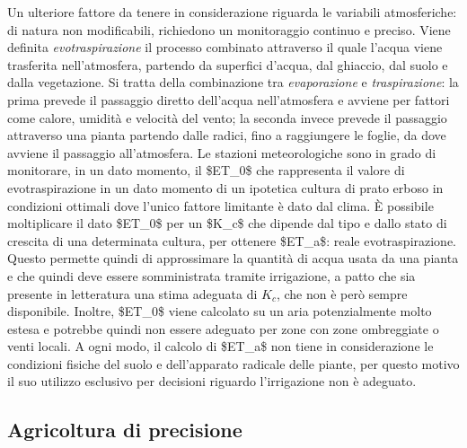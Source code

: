 \documentclass[12pt,a4paper,openright,twoside]{book}
\begin{document}
Un ulteriore fattore da tenere in considerazione riguarda le variabili atmosferiche: di natura non modificabili, richiedono un monitoraggio continuo e preciso. Viene definita \textit{evotraspirazione} il processo combinato attraverso il quale l'acqua viene trasferita nell'atmosfera, partendo da superfici d'acqua, dal ghiaccio, dal suolo e dalla vegetazione\cite{Kirkham2014}. Si tratta della combinazione tra \textit{evaporazione} e \textit{traspirazione}: la prima prevede il passaggio diretto dell'acqua nell'atmosfera e avviene per fattori come calore, umidità e velocità del vento; la seconda invece prevede il passaggio attraverso una pianta partendo dalle radici, fino a raggiungere le foglie, da dove avviene il passaggio all'atmosfera.
Le stazioni meteorologiche\cite{Allen1998CropE} sono in grado di monitorare, in un dato momento, il \ac{$ET_0$} che rappresenta il valore di evotraspirazione in un dato momento di un ipotetica cultura di prato erboso in condizioni ottimali dove l'unico fattore limitante è dato dal clima. È possibile moltiplicare il dato \ac{$ET_0$} per un \ac{$K_c$} che dipende dal tipo e dallo stato di crescita di una determinata cultura, per ottenere \ac{$ET_a$}: reale evotraspirazione.
Questo permette quindi di approssimare la quantità di acqua usata da una pianta e che quindi deve essere somministrata tramite irrigazione, a patto che sia presente in letteratura una stima adeguata di $K_c$, che non è però sempre disponibile. Inoltre, \ac{$ET_0$} viene calcolato su un aria potenzialmente molto estesa e potrebbe quindi non essere adeguato per zone con zone ombreggiate o venti locali.
A ogni modo, il calcolo di \ac{$ET_a$} non tiene in considerazione le condizioni fisiche del suolo e dell'apparato radicale delle piante, per questo motivo il suo utilizzo esclusivo per decisioni riguardo l'irrigazione non è adeguato.

\subsection{Agricoltura di precisione}
\end{document}
